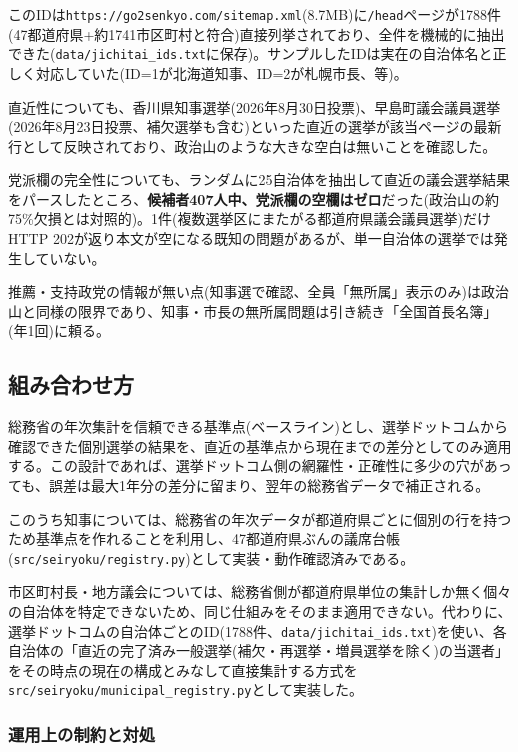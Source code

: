 \documentclass[a4paper,11pt]{ltjsarticle}
\begin{document}
このIDは\texttt{https://go2senkyo.com/sitemap.xml}(8.7MB)に\texttt{/head}ページが1788件(47都道府県+約1741市区町村と符合)直接列挙されており、全件を機械的に抽出できた(\texttt{data/jichitai\_ids.txt}に保存)。サンプルしたIDは実在の自治体名と正しく対応していた(ID=1が北海道知事、ID=2が札幌市長、等)。

直近性についても、香川県知事選挙(2026年8月30日投票)、早島町議会議員選挙(2026年8月23日投票、補欠選挙も含む)といった直近の選挙が該当ページの最新行として反映されており、政治山のような大きな空白は無いことを確認した。

党派欄の完全性についても、ランダムに25自治体を抽出して直近の議会選挙結果をパースしたところ、\textbf{候補者407人中、党派欄の空欄はゼロ}だった(政治山の約75\%欠損とは対照的)。1件(複数選挙区にまたがる都道府県議会議員選挙)だけHTTP 202が返り本文が空になる既知の問題があるが、単一自治体の選挙では発生していない。

推薦・支持政党の情報が無い点(知事選で確認、全員「無所属」表示のみ)は政治山と同様の限界であり、知事・市長の無所属問題は引き続き「全国首長名簿」(年1回)に頼る。

\subsection{組み合わせ方}

総務省の年次集計を信頼できる基準点(ベースライン)とし、選挙ドットコムから確認できた個別選挙の結果を、直近の基準点から現在までの差分としてのみ適用する。この設計であれば、選挙ドットコム側の網羅性・正確性に多少の穴があっても、誤差は最大1年分の差分に留まり、翌年の総務省データで補正される。

このうち知事については、総務省の年次データが都道府県ごとに個別の行を持つため基準点を作れることを利用し、47都道府県ぶんの議席台帳(\texttt{src/seiryoku/registry.py})として実装・動作確認済みである。

市区町村長・地方議会については、総務省側が都道府県単位の集計しか無く個々の自治体を特定できないため、同じ仕組みをそのまま適用できない。代わりに、選挙ドットコムの自治体ごとのID(1788件、\texttt{data/jichitai\_ids.txt})を使い、各自治体の「直近の完了済み一般選挙(補欠・再選挙・増員選挙を除く)の当選者」をその時点の現在の構成とみなして直接集計する方式を\texttt{src/seiryoku/municipal\_registry.py}として実装した。

\subsubsection{運用上の制約と対処}
\end{document}
